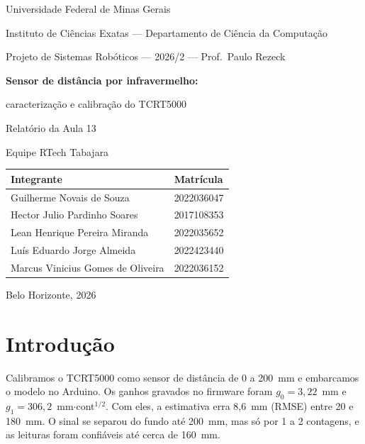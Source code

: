 \documentclass[11pt,a4paper]{article}
\begin{document}
\begin{titlepage}
\centering
{\large Universidade Federal de Minas Gerais\par}
{\large Instituto de Ciências Exatas --- Departamento de Ciência da Computação\par}
\vspace{0.4cm}
{Projeto de Sistemas Robóticos --- 2026/2 --- Prof.\ Paulo Rezeck\par}
\vspace{3.5cm}
{\LARGE\bfseries Sensor de distância por infravermelho:\par}
\vspace{0.2cm}
{\Large caracterização e calibração do TCRT5000\par}
\vspace{0.6cm}
{\large Relatório da Aula 13\par}
\vspace{3cm}
{\large Equipe RTech Tabajara\par}
\vspace{0.6cm}
\begin{tabular}{ll}
\toprule
Integrante & Matrícula \\
\midrule
Guilherme Novais de Souza & 2022036047 \\
Hector Julio Pardinho Soares & 2017108353 \\
Lean Henrique Pereira Miranda & 2022035652 \\
Luís Eduardo Jorge Almeida & 2022423440 \\
Marcus Vinicius Gomes de Oliveira & 2022036152 \\
\bottomrule
\end{tabular}
\vfill
{Belo Horizonte, 2026\par}
\end{titlepage}

\section{Introdução}

Calibramos o TCRT5000 como sensor de distância de 0 a 200~mm e embarcamos o modelo no Arduino. Os ganhos gravados no firmware foram $g_0 = 3{,}22$~mm e $g_1 = 306{,}2$~mm$\cdot$cont$^{1/2}$. Com eles, a estimativa erra 8,6~mm (RMSE) entre 20 e 180~mm. O sinal se separou do fundo até 200~mm, mas só por 1 a 2 contagens, e as leituras foram confiáveis até cerca de 160~mm.
\end{document}
